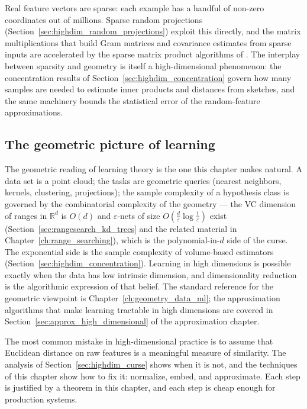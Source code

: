 Real feature vectors are sparse: each example has a handful of non-zero
coordinates out of millions. Sparse random projections
(Section~\ref{sec:highdim_random_projections}) exploit this directly, and the
matrix multiplications that build Gram matrices and covariance estimates from
sparse inputs are accelerated by the sparse matrix product algorithms of
\cite{yuster2004}. The interplay between sparsity and geometry is itself a
high-dimensional phenomenon: the concentration results of
Section~\ref{sec:highdim_concentration} govern how many samples are needed to
estimate inner products and distances from sketches, and the same machinery
bounds the statistical error of the random-feature approximations.

\subsection{The geometric picture of learning}

The geometric reading of learning theory is the one this chapter makes
natural. A data set is a point cloud; the tasks are geometric queries
(nearest neighbors, kernels, clustering, projections); the sample complexity
of a hypothesis class is governed by the combinatorial complexity of the
geometry --- the VC dimension of ranges in $\mathbb{R}^d$ is $O(d)$ and
$\varepsilon$-nets of size $O(\frac{d}{\varepsilon}\log\frac{1}{\varepsilon})$
exist (Section~\ref{sec:rangesearch_kd_trees} and the related material in
Chapter~\ref{ch:range_searching}), which is the polynomial-in-$d$ side of the
curse. The exponential side is the sample complexity of volume-based
estimators (Section~\ref{sec:highdim_concentration}). Learning in high
dimensions is possible exactly when the data has low intrinsic dimension, and
dimensionality reduction is the algorithmic expression of that belief. The
standard reference for the geometric viewpoint is
Chapter~\ref{ch:geometry_data_ml}; the approximation algorithms that make
learning tractable in high dimensions are covered in
Section~\ref{sec:approx_high_dimensional} of the approximation chapter.

\begin{remark}
The most common mistake in high-dimensional practice is to assume that
Euclidean distance on raw features is a meaningful measure of similarity. The
analysis of Section~\ref{sec:highdim_curse} shows when it is not, and the
techniques of this chapter show how to fix it: normalize, embed, and
approximate. Each step is justified by a theorem in this chapter, and each
step is cheap enough for production systems.
\end{remark}

